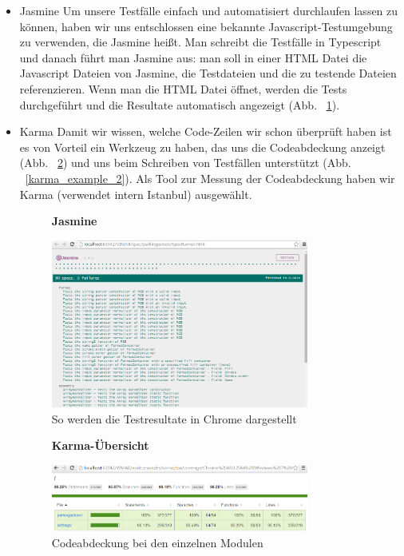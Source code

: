 \documentclass[qualitaetssicherung.tex]{subfiles}
\begin{document}
\begin{itemize}
	
	\item

	Jasmine\newline	
	Um unsere Testfälle einfach und automatisiert durchlaufen lassen zu können, haben wir uns entschlossen eine bekannte Javascript-Testumgebung zu verwenden, die Jasmine heißt. Man schreibt die Testfälle in Typescript und danach führt man Jasmine aus: man soll in einer HTML Datei die Javascript Dateien von Jasmine, die Testdateien und die zu testende Dateien referenzieren. Wenn man die HTML Datei öffnet, werden die Tests durchgeführt und die Resultate automatisch angezeigt (Abb. ~\ref{jasmine_example}).
	
	\item
	Karma\newline
	Damit wir wissen, welche Code-Zeilen wir schon überprüft haben ist es von Vorteil ein Werkzeug zu haben, das uns die Codeabdeckung anzeigt (Abb. ~\ref{karma_example_1}) und uns beim Schreiben von Testfällen unterstützt (Abb. ~\ref{karma_example_2}). Als Tool zur Messung der Codeabdeckung haben wir Karma (verwendet intern Istanbul) ausgewählt.\newline

	\begin{figure}[H]
		\centering
    \textbf{Jasmine}\par\medskip
    \includegraphics[width=0.8\textwidth]{Images/jasmine-example.png}
    \caption{So werden die Testresultate in Chrome dargestellt}
		\label{jasmine_example}
	\end{figure}
	
	\begin{figure}[H]
		\centering
    \textbf{Karma-Übersicht}\par\medskip
    \includegraphics[width=0.8\textwidth]{Images/karma-example-1.png}
    \caption{Codeabdeckung bei den einzelnen Modulen}
		\label{karma_example_1}
	\end{figure}
	

\end{itemize}
\end{document}
